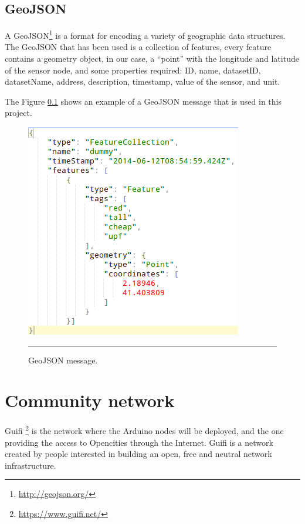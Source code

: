 \documentclass[12pt, a4paper,twoside]{tesi_upf}
\begin{document}
    \subsection{GeoJSON}
    \label{GeoJSON}
      A GeoJSON\footnote{\url{http://geojson.org/}} is a format for encoding a variety of geographic data structures. The GeoJSON that has been used is a collection of features, every feature contains a geometry object, in our case, a ``point'' with the longitude and latitude of the sensor node, and some properties required: ID, name, datasetID, datasetName, address, description, timestamp, value of the sensor, and unit.
      
      The Figure \ref{GeoJSON} shows an example of a GeoJSON message that is used in this project.
      \begin{figure}[htbp]
        \centering
            \includegraphics[scale=0.5]{./Figures/GeoJSON.png}
            \\
            \rule{15em}{0.5pt}
        \caption[GeoJSON message]{GeoJSON message.}
        \label{fig:GeoJSON}
      \end{figure}
    
  \section{Community network}
    Guifi \footnote{\url{https://www.guifi.net/}} is the network where the Arduino nodes will be deployed, and the one providing the access to Opencities through the Internet.
    Guifi is a network created by people interested in building an open, free and neutral network infrastructure.
    
\end{document}
